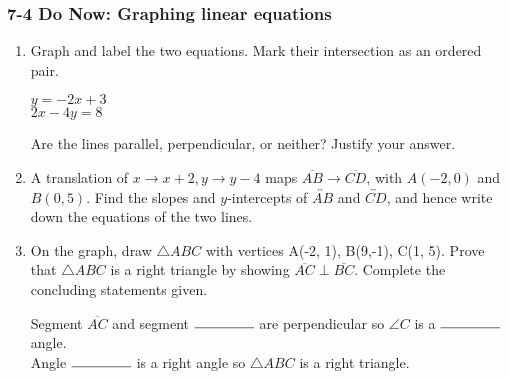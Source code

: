 \documentclass[12pt, twoside]{article}
\begin{document}
\subsubsection*{7-4 Do Now: Graphing linear equations}
  \begin{enumerate}

\item Graph and label the two equations. Mark their intersection as an ordered pair.

  \begin{multicols}{2}
    $y = -2x+3$ \\
    $2x-4y = 8$
  \end{multicols}
  Are the lines parallel, perpendicular, or neither? Justify your answer.
  \vspace{1.5cm}

  \begin{center} %
  \end{center}


    \item A translation of $x \rightarrow x+2, y \rightarrow y-4$ maps $\overline{AB} \rightarrow \overline{CD}$, with $A(-2,0)$ and $B(0,5)$. Find the slopes and $y$-intercepts of $\overleftrightarrow{AB}$ and $\overleftrightarrow{CD}$, and hence write down the equations of the two lines.

\newpage

\item On the graph, draw $\triangle ABC$ with vertices A(-2, 1), B(9,-1), C(1, 5). Prove that $\triangle ABC$ is a right triangle by showing $\overline{AC} \perp \overline{BC}$. Complete the concluding statements given.\\[1cm]
\vspace{8cm}

Segment $\overline{AC}$ and segment $\rule{1.5cm}{0.15mm}$ are perpendicular so $\angle C$ is a $\rule{1.5cm}{0.15mm}$ angle.\\[0.5cm]
Angle $\rule{1.5cm}{0.15mm}$ is a right angle so $\triangle ABC$ is a right triangle.

  \end{enumerate}
  \newpage
  \setcounter{page}{1}
\end{document}
